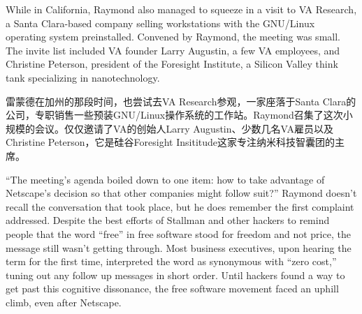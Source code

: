 

\ifdefined\eng
While in California, Raymond also managed to squeeze in a visit to VA Research, a Santa Clara-based company selling workstations with the GNU/Linux operating system preinstalled. Convened by Raymond, the meeting was small. The invite list included VA founder Larry Augustin, a few VA employees, and Christine Peterson, president of the Foresight Institute, a Silicon Valley think tank specializing in nanotechnology.
\fi

\ifdefined\chs
雷蒙德在加州的那段时间，也尝试去VA Research参观，一家座落于Santa Clara的公司，专职销售一些预装GNU/Linux操作系统的工作站。Raymond召集了这次小规模的会议。仅仅邀请了VA的创始人Larry Augustin、少数几名VA雇员以及Christine Peterson，它是硅谷Foresight Insititude这家专注纳米科技智囊团的主席。
\fi

\ifdefined\eng
``The meeting's agenda boiled down to one item: how to take advantage of Netscape's decision so that other companies might follow suit?'' Raymond doesn't recall the conversation that took place, but he does remember the first complaint addressed. Despite the best efforts of Stallman and other hackers to remind people that the word ``free'' in free software stood for freedom and not price, the message still wasn't getting through. Most business executives, upon hearing the term for the first time, interpreted the word as synonymous with ``zero cost,'' tuning out any follow up messages in short order. Until hackers found a way to get past this cognitive dissonance, the free software movement faced an uphill climb, even after Netscape.
\fi


